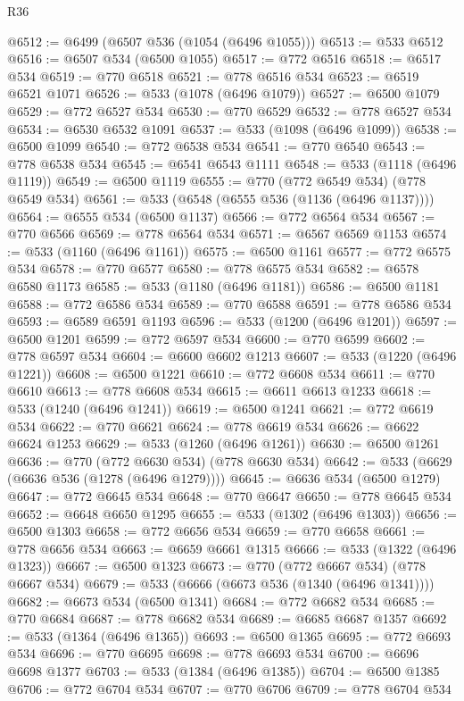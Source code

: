 \begin{lexlean}{R36}
\begin{coremodule}
@6512 := @6499 (@6507 @536 (@1054 (@6496 @1055)))
@6513 := @533 @6512
@6516 := @6507 @534 (@6500 @1055)
@6517 := @772 @6516
@6518 := @6517 @534
@6519 := @770 @6518
@6521 := @778 @6516 @534
@6523 := @6519 @6521 @1071
@6526 := @533 (@1078 (@6496 @1079))
@6527 := @6500 @1079
@6529 := @772 @6527 @534
@6530 := @770 @6529
@6532 := @778 @6527 @534
@6534 := @6530 @6532 @1091
@6537 := @533 (@1098 (@6496 @1099))
@6538 := @6500 @1099
@6540 := @772 @6538 @534
@6541 := @770 @6540
@6543 := @778 @6538 @534
@6545 := @6541 @6543 @1111
@6548 := @533 (@1118 (@6496 @1119))
@6549 := @6500 @1119
@6555 := @770 (@772 @6549 @534) (@778 @6549 @534)
@6561 := @533 (@6548 (@6555 @536 (@1136 (@6496 @1137))))
@6564 := @6555 @534 (@6500 @1137)
@6566 := @772 @6564 @534
@6567 := @770 @6566
@6569 := @778 @6564 @534
@6571 := @6567 @6569 @1153
@6574 := @533 (@1160 (@6496 @1161))
@6575 := @6500 @1161
@6577 := @772 @6575 @534
@6578 := @770 @6577
@6580 := @778 @6575 @534
@6582 := @6578 @6580 @1173
@6585 := @533 (@1180 (@6496 @1181))
@6586 := @6500 @1181
@6588 := @772 @6586 @534
@6589 := @770 @6588
@6591 := @778 @6586 @534
@6593 := @6589 @6591 @1193
@6596 := @533 (@1200 (@6496 @1201))
@6597 := @6500 @1201
@6599 := @772 @6597 @534
@6600 := @770 @6599
@6602 := @778 @6597 @534
@6604 := @6600 @6602 @1213
@6607 := @533 (@1220 (@6496 @1221))
@6608 := @6500 @1221
@6610 := @772 @6608 @534
@6611 := @770 @6610
@6613 := @778 @6608 @534
@6615 := @6611 @6613 @1233
@6618 := @533 (@1240 (@6496 @1241))
@6619 := @6500 @1241
@6621 := @772 @6619 @534
@6622 := @770 @6621
@6624 := @778 @6619 @534
@6626 := @6622 @6624 @1253
@6629 := @533 (@1260 (@6496 @1261))
@6630 := @6500 @1261
@6636 := @770 (@772 @6630 @534) (@778 @6630 @534)
@6642 := @533 (@6629 (@6636 @536 (@1278 (@6496 @1279))))
@6645 := @6636 @534 (@6500 @1279)
@6647 := @772 @6645 @534
@6648 := @770 @6647
@6650 := @778 @6645 @534
@6652 := @6648 @6650 @1295
@6655 := @533 (@1302 (@6496 @1303))
@6656 := @6500 @1303
@6658 := @772 @6656 @534
@6659 := @770 @6658
@6661 := @778 @6656 @534
@6663 := @6659 @6661 @1315
@6666 := @533 (@1322 (@6496 @1323))
@6667 := @6500 @1323
@6673 := @770 (@772 @6667 @534) (@778 @6667 @534)
@6679 := @533 (@6666 (@6673 @536 (@1340 (@6496 @1341))))
@6682 := @6673 @534 (@6500 @1341)
@6684 := @772 @6682 @534
@6685 := @770 @6684
@6687 := @778 @6682 @534
@6689 := @6685 @6687 @1357
@6692 := @533 (@1364 (@6496 @1365))
@6693 := @6500 @1365
@6695 := @772 @6693 @534
@6696 := @770 @6695
@6698 := @778 @6693 @534
@6700 := @6696 @6698 @1377
@6703 := @533 (@1384 (@6496 @1385))
@6704 := @6500 @1385
@6706 := @772 @6704 @534
@6707 := @770 @6706
@6709 := @778 @6704 @534

\end{coremodule}
\end{lexlean}
